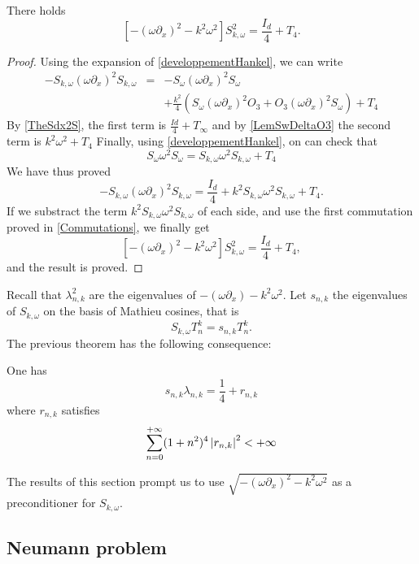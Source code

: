 \documentclass[a4paper]{article}
\begin{document}
\begin{The} There holds
	\label{TheHelmholtz}
	\[\left[-(\omega \partial_x)^2 - k^2\omega^2\right]S_{k,\omega}^2 = \frac{I_d}{4} + T_4.\]
	\begin{proof}
		Using the expansion of \autoref{developpementHankel}, we can write 
		\begin{eqnarray*}
			-S_{k,\omega}(\omega \partial_x)^2 S_{k,\omega} &=& -S_\omega (\omega \partial_x)^2 S_\omega \\
			&& + \frac{k^2}{4}\left(S_\omega (\omega \partial_x)^2 O_3 + O_3 (\omega \partial_x)^2 S_\omega\right) + T_4
		\end{eqnarray*}
		By \autoref{TheSdx2S}, the first term is $\frac{Id}{4} + T_\infty$ and by \autoref{LemSwDeltaO3} the second term is $k^2 \omega^2 + T_ 4$
		Finally, using \autoref{developpementHankel}, on can check that
		\[S_\omega \omega^2 S_\omega =  S_{k,\omega} \omega^2 S_{k,\omega} + T_4\]
		We have thus proved 
		\[-S_{k,\omega} (\omega \partial_x)^2 S_{k,\omega} = \frac{I_d}{4} + k^2S_{k,\omega} \omega^2 S_{k,\omega} + T_4.\]
		If we substract the term $k^2 S_{k,\omega} \omega^2 S_{k,\omega}$ of each side, and use the first commutation proved in \autoref{Commutations}, we finally get 
		\[ \left[-(\omega \partial_x)^2 - k^2 \omega^2\right]S_{k,\omega}^2  = \frac{I_d}{4} + T_4,\]
		and the result is proved. 
	\end{proof}
\end{The}
Recall that $\lambda_{n,k}^2$ are the eigenvalues of $-(\omega \partial_x) - k^2\omega^2$. Let $s_{n,k}$ the eigenvalues of $S_{k,\omega}$ on the basis of Mathieu cosines, that is
\[S_{k,\omega}T_{n}^k = s_{n,k}T_n^k.\]
The previous theorem has the following consequence:
\begin{Cor}
	One has
	\[s_{n,k} \lambda_{n,k} = \frac{1}{4} + r_{n,k}\]
	where $r_{n,k}$ satisfies 
	\[\sum_{n = 0}^{+ \infty}(1 + n^2)^4 \left\lvert r_{n,k} \right\rvert^2  < + \infty\]
\end{Cor}

The results of this section prompt us to use $\sqrt{-(\omega \partial_x)^2 - k^2\omega^2}$ as a preconditioner for $S_{k,\omega}$. 



\subsection{Neumann problem}
\end{document}

